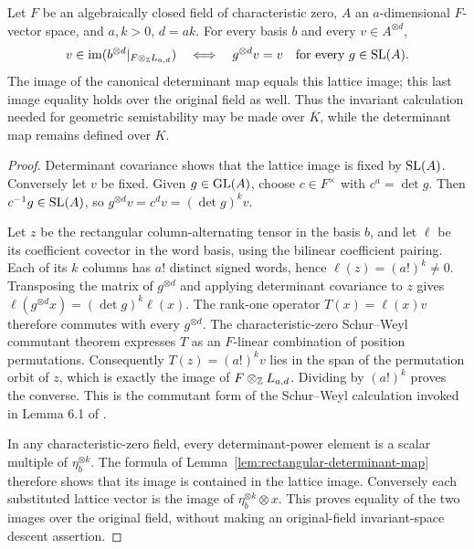 \begin{lemma}
\label{lem:rectangular-specht-invariants}
\leanok
Let $F$ be an algebraically closed field of characteristic zero,
$A$ an $a$-dimensional $F$-vector space, and $a,k>0$, $d=ak$.
For every basis $b$ and every $v\in A^{\otimes d}$,
\[
 v\in\operatorname{im}(b^{\otimes d}|_{F\otimes_\mathbb Z L_{a,d}})
 \quad\Longleftrightarrow\quad
 g^{\otimes d}v=v\quad\hbox{for every }g\in\operatorname{SL}(A).
\]
The image of the canonical determinant map equals this lattice image;
this last image equality holds over the original field as well.
Thus the invariant calculation needed for geometric semistability may
be made over $\overline K$, while the determinant map remains defined over $K$.
\end{lemma}
\begin{proof}
Determinant covariance shows that the lattice image is fixed by $\operatorname{SL}(A)$.
Conversely let $v$ be fixed. Given $g\in\operatorname{GL}(A)$, choose $c\in F^\times$
with $c^a=\det g$. Then $c^{-1}g\in\operatorname{SL}(A)$, so
$g^{\otimes d}v=c^dv=(\det g)^kv$.

Let $z$ be the rectangular column-alternating tensor in the basis $b$,
and let $\ell$ be its coefficient covector in the word basis, using
the bilinear coefficient pairing. Each of its $k$ columns has $a!$
distinct signed words, hence $\ell(z)=(a!)^k\ne0$.
Transposing the matrix of $g^{\otimes d}$ and applying determinant
covariance to $z$ gives
$\ell(g^{\otimes d}x)=(\det g)^k\ell(x)$.
The rank-one operator $T(x)=\ell(x)v$ therefore commutes with every
$g^{\otimes d}$. The characteristic-zero Schur--Weyl commutant theorem
expresses $T$ as an $F$-linear combination of position permutations.
Consequently $T(z)=(a!)^kv$ lies in the span of the permutation orbit
of $z$, which is exactly the image of $F\otimes_\mathbb Z L_{a,d}$.
Dividing by $(a!)^k$ proves the converse. This is the commutant form of
the Schur--Weyl calculation invoked in Lemma 6.1 of \cite{bost2026}.

In any characteristic-zero field, every determinant-power element is
a scalar multiple of $\eta_b^{\otimes k}$. The formula of
Lemma~\ref{lem:rectangular-determinant-map} therefore shows that its
image is contained in the lattice image. Conversely each substituted
lattice vector is the image of $\eta_b^{\otimes k}\otimes x$.
This proves equality of the two images over the original field,
without making an original-field invariant-space descent assertion.
\end{proof}

